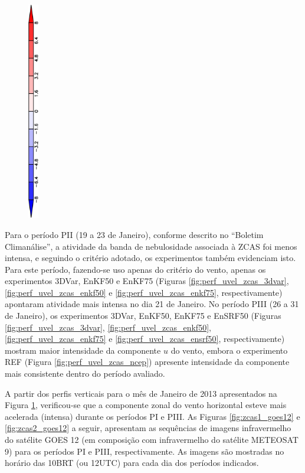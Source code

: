 \begin{figure}[H]
\begin{center}
        \includegraphics[width=0.04\textwidth,angle=-90]{./figs/cap5/estudo_zcas/cbar/cbar_perf_uvel-crop.pdf}
    \end{center}
    \vspace{2mm}
    \legenda{}
    \label{fig:perf_uvel_zcas}
\end{figure}

Para o período PII (19 a 23 de Janeiro), conforme descrito no ``Boletim Climanálise'', a atividade da banda de nebulosidade associada à ZCAS foi menos intensa, e seguindo o critério adotado, os experimentos também evidenciam isto. Para este período, fazendo-se uso apenas do critério do vento, apenas os experimentos 3DVar, EnKF50 e EnKF75 (Figuras \ref{fig:perf_uvel_zcas_3dvar}, \ref{fig:perf_uvel_zcas_enkf50} e \ref{fig:perf_uvel_zcas_enkf75}, respectivamente) apontaram atividade mais intensa no dia 21 de Janeiro. No período PIII (26 a 31 de Janeiro), os experimentos 3DVar, EnKF50, EnKF75 e EnSRF50 (Figuras \ref{fig:perf_uvel_zcas_3dvar}, \ref{fig:perf_uvel_zcas_enkf50}, \ref{fig:perf_uvel_zcas_enkf75} e \ref{fig:perf_uvel_zcas_ensrf50}, respectivamente) mostram maior intensidade da componente $u$ do vento, embora o experimento REF (Figura \ref{fig:perf_uvel_zcas_ncep}) apresente intensidade da componente mais consistente dentro do período avaliado.

A partir dos perfis verticais para o mês de Janeiro de 2013 apresentados na Figura \ref{fig:perf_uvel_zcas}, verificou-se que a componente zonal do vento horizontal esteve mais acelerada (intensa) durante os períodos PI e PIII. As Figuras \ref{fig:zcas1_goes12} e \ref{fig:zcas2_goes12} a seguir, apresentam as sequências de imagens infravermelho do satélite GOES 12 (em composição com infravermelho do satélite METEOSAT 9) para os períodos PI e PIII, respectivamente. As imagens são mostradas no horário das 10BRT (ou 12UTC) para cada dia dos períodos indicados.

